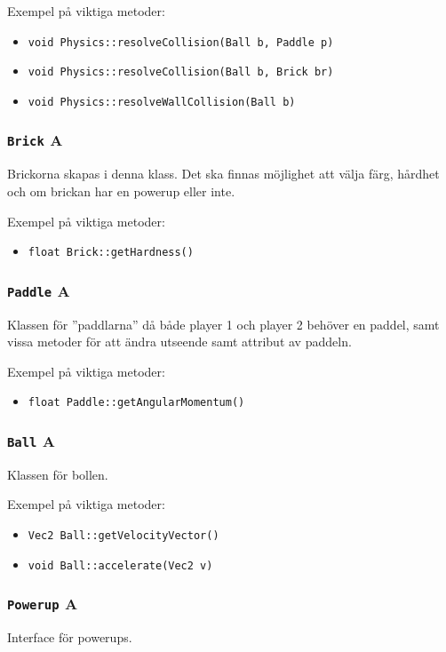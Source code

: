 \documentclass[a4paper,11pt]{article}
\begin{document}
\bigskip
\noindent Exempel på viktiga metoder:
\begin{itemize}
\item \texttt{void Physics::resolveCollision(Ball b, Paddle p)}
\item \texttt{void Physics::resolveCollision(Ball b, Brick br)}
\item \texttt{void Physics::resolveWallCollision(Ball b)}
\end{itemize}

\subsubsection{\texttt{Brick} A}
\noindent Brickorna skapas i denna klass. Det ska finnas möjlighet att välja färg, hårdhet och om 
brickan har en powerup eller inte.

\bigskip
\noindent Exempel på viktiga metoder:
\begin{itemize}
\item \texttt{float Brick::getHardness()}
\end{itemize}

\subsubsection{\texttt{Paddle} A}
\noindent Klassen för ''paddlarna'' då både player 1 och player 2 behöver en paddel, samt vissa metoder
för att ändra utseende samt attribut av paddeln.

\bigskip
\noindent Exempel på viktiga metoder:
\begin{itemize}
\item \texttt{float Paddle::getAngularMomentum()}
\end{itemize}

\subsubsection{\texttt{Ball} A}
\noindent Klassen för bollen.

\bigskip
\noindent Exempel på viktiga metoder:
\begin{itemize}
\item \texttt{Vec2 Ball::getVelocityVector()}
\item \texttt{void Ball::accelerate(Vec2 v)}
\end{itemize}

\subsubsection{\texttt{Powerup} A}
\noindent Interface för powerups.
\end{document}
